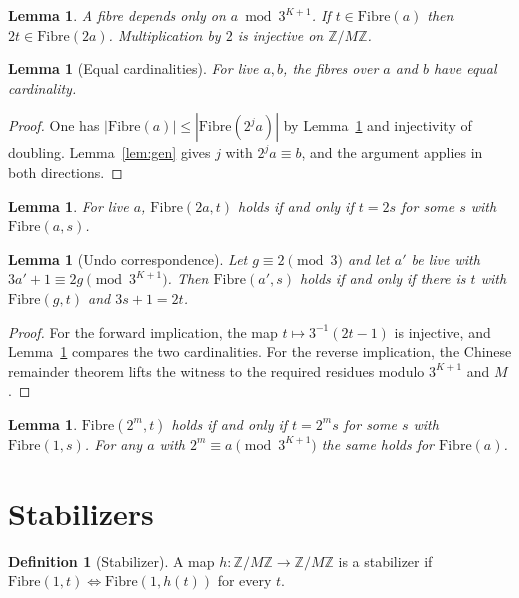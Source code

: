 \documentclass[11pt,reqno,oneside]{amsart}
\theoremstyle{plain}
\newtheorem{lemma}[theorem]{Lemma}
\theoremstyle{definition}
\newtheorem{definition}[theorem]{Definition}
\numberwithin{equation}{section}
\begin{document}
\begin{lemma}\label{lem:fibrebasic}
A fibre depends only on $a\bmod3^{K+1}$. If $t\in\mathrm{Fibre}(a)$ then $2t\in\mathrm{Fibre}(2a)$. Multiplication by $2$ is injective on $\mathbb Z/M\mathbb Z$.
\end{lemma}

\begin{lemma}[Equal cardinalities]\label{lem:fibrecard}
For live $a,b$, the fibres over $a$ and $b$ have equal cardinality.
\end{lemma}
\begin{proof}
One has $|\mathrm{Fibre}(a)|\le|\mathrm{Fibre}(2^ja)|$ by Lemma~\ref{lem:fibrebasic} and injectivity of doubling. Lemma~\ref{lem:gen} gives $j$ with $2^ja\equiv b$, and the argument applies in both directions.
\end{proof}

\begin{lemma}\label{lem:fibredbl}
For live $a$, $\mathrm{Fibre}(2a,t)$ holds if and only if $t=2s$ for some $s$ with $\mathrm{Fibre}(a,s)$.
\end{lemma}

\begin{lemma}[Undo correspondence]\label{lem:undo}
Let $g\equiv2\pmod 3$ and let $a'$ be live with $3a'+1\equiv2g\pmod{3^{K+1}}$. Then $\mathrm{Fibre}(a',s)$ holds if and only if there is $t$ with $\mathrm{Fibre}(g,t)$ and $3s+1=2t$.
\end{lemma}
\begin{proof}
For the forward implication, the map $t\mapsto3^{-1}(2t-1)$ is injective, and Lemma~\ref{lem:fibrecard} compares the two cardinalities. For the reverse implication, the Chinese remainder theorem lifts the witness to the required residues modulo $3^{K+1}$ and $M$.
\end{proof}

\begin{lemma}\label{lem:fibrepow}
$\mathrm{Fibre}(2^m,t)$ holds if and only if $t=2^ms$ for some $s$ with $\mathrm{Fibre}(1,s)$. For any $a$ with $2^m\equiv a\pmod{3^{K+1}}$ the same holds for $\mathrm{Fibre}(a)$.
\end{lemma}

\section{Stabilizers}\label{sec:stab}

\begin{definition}[Stabilizer]\label{def:stab}
A map $h\colon\mathbb Z/M\mathbb Z\to\mathbb Z/M\mathbb Z$ is a stabilizer if $\mathrm{Fibre}(1,t)\iff\mathrm{Fibre}(1,h(t))$ for every $t$.
\end{definition}
\end{document}
